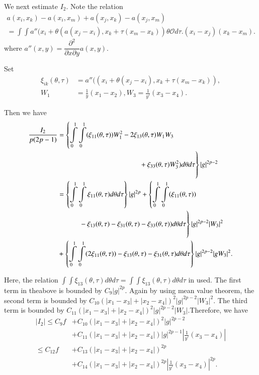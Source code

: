 We next estimate $I_2$. Note the relation
\begin{multline*}
  a(x_i,x_k) -a(x_i,x_m) +a(x_j,x_k)-a(x_j,x_m)\\
  = \int \int a''(x_i+\theta(a(x_j - x_i), x_k + \tau (x_m - x_k)) \theta
   \mathscr{O} d \tau . (x_i - x_j) (x_k - x_m). 
\end{multline*}
where $a'' (x,y)= \dfrac{\partial^2}{\partial x \partial y} a (x,y)$.

Set
\begin{align*}
\xi_{ik}{{(\theta, \tau)}} &= a'' ((x_i+\theta(x_j -x_i), x_k + \tau
(x_m -x_k)),\\ 
W_1 & =\frac{1}{y} (x_1-x_2), W_3 = \frac{1}{y'} (x_3-x_4).
\end{align*}


Then we have
{\fontsize{10}{12}\selectfont
\begin{align*}
  \frac{I_2}{p(2p-1)} & = \left\{ \int\limits_0^1 \int\limits_0^1
  (\xi_{11}{{(\theta, \tau)}}) W^2_1-2  \xi_{13}{{(\theta,\tau)}} W_1
  W_3\right.\\ 
  & \hspace{4cm}\left. \vphantom{\int\limits_0^1} +
  \xi_{33}{{(\theta,\tau)}} W^2_3)  d \theta d \tau \right \} |g|^{2p-2}\\  
  & =\left\{ \int\limits_0^1 \int\limits_0^1 \xi_{11}{{(\theta, \tau)}}
  d \theta d \tau \right\} |g|^{2p} + \left\{ \int\limits_0^1
  \int\limits_0^1 (\xi_{11}{{(\theta, \tau)}})\right.\\ 
  & \hspace{1cm}\left. \vphantom{\int\limits_0^1} -\xi_{13}{{(\theta,\tau)}} -
  \xi_{31}{{(\theta,\tau)}}-\xi_{33}{{(\theta,\tau)}}) d \theta d \tau
  \right\} |g|^{2p-2}|W_3|^2\\ 
  & + \left\{ \int\limits_0^1 \int\limits_0^1 (2 \xi_{11}{{(\theta,
      \tau)}}) -\xi_{13}{{(\theta,\tau)}} - \xi_{31}{{(\theta,\tau)}} d
  \theta d \tau \right\} |g|^{2p-2}|gW_3|^2. 
 \end{align*}}\relax
  
 Here, the relation $\int \int \xi_{13}(\theta, \tau) d \theta d \tau
 = \int \int \xi_{13}(\theta, \tau) d \theta d \tau$ in used. The
 first term in the\pageoriginale above is bounded by $C_9 |g|^{2p}$. Again by using
 mean value theorem, the second term is bounded by $C_{10}
 (|x_1-x_3|+|x_2-x_4|)^2 |g|^{2p-2}|W_3|^2$. The third term  is
 bounded  by  $C_{11} (|x_1-x_3|+|x_2-x_4|)^2
 |g|^{2p-2}|W_3|$.Therefore, we have 
 \begin{align*}
   |I_2| \le C_9 f & + C_{10}(|x_1-x_3|+|x_2-x_4|)^2 |g|^{2p-2}\\
   & + C_{11}(|x_1-x_3|+|x_2-x_4|) |g|^{2p-1}| \frac{1}{y'} (x_3-x_4)|\\
   \le C_{12} f & + C_{13}(|x_1-x_3|+|x_2-x_4|)^{2p}\\
   & +C_{14} (|x_1-x_3|+|x_2-x_4|)^{2p} |\frac{1}{y'} 
(x_3-x_4)|^{2p}. \tag{1.4.5}\label{c1:eq1.4.5}
 \end{align*} 
  
